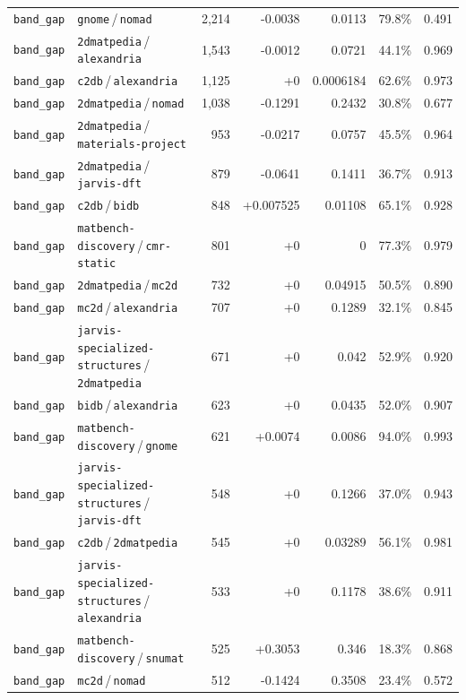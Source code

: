 \begin{longtable}{llrrrrr}
\texttt{band\_gap} & \texttt{gnome}\,/\,\texttt{nomad} & 2{,}214 & -0.0038 & 0.0113 & 79.8\% & 0.491 \\
\texttt{band\_gap} & \texttt{2dmatpedia}\,/\,\texttt{alexandria} & 1{,}543 & -0.0012 & 0.0721 & 44.1\% & 0.969 \\
\texttt{band\_gap} & \texttt{c2db}\,/\,\texttt{alexandria} & 1{,}125 & +0 & 0.0006184 & 62.6\% & 0.973 \\
\texttt{band\_gap} & \texttt{2dmatpedia}\,/\,\texttt{nomad} & 1{,}038 & -0.1291 & 0.2432 & 30.8\% & 0.677 \\
\texttt{band\_gap} & \texttt{2dmatpedia}\,/\,\texttt{materials-project} & 953 & -0.0217 & 0.0757 & 45.5\% & 0.964 \\
\texttt{band\_gap} & \texttt{2dmatpedia}\,/\,\texttt{jarvis-dft} & 879 & -0.0641 & 0.1411 & 36.7\% & 0.913 \\
\texttt{band\_gap} & \texttt{c2db}\,/\,\texttt{bidb} & 848 & +0.007525 & 0.01108 & 65.1\% & 0.928 \\
\texttt{band\_gap} & \texttt{matbench-discovery}\,/\,\texttt{cmr-static} & 801 & +0 & 0 & 77.3\% & 0.979 \\
\texttt{band\_gap} & \texttt{2dmatpedia}\,/\,\texttt{mc2d} & 732 & +0 & 0.04915 & 50.5\% & 0.890 \\
\texttt{band\_gap} & \texttt{mc2d}\,/\,\texttt{alexandria} & 707 & +0 & 0.1289 & 32.1\% & 0.845 \\
\texttt{band\_gap} & \texttt{jarvis-specialized-structures}\,/\,\texttt{2dmatpedia} & 671 & +0 & 0.042 & 52.9\% & 0.920 \\
\texttt{band\_gap} & \texttt{bidb}\,/\,\texttt{alexandria} & 623 & +0 & 0.0435 & 52.0\% & 0.907 \\
\texttt{band\_gap} & \texttt{matbench-discovery}\,/\,\texttt{gnome} & 621 & +0.0074 & 0.0086 & 94.0\% & 0.993 \\
\texttt{band\_gap} & \texttt{jarvis-specialized-structures}\,/\,\texttt{jarvis-dft} & 548 & +0 & 0.1266 & 37.0\% & 0.943 \\
\texttt{band\_gap} & \texttt{c2db}\,/\,\texttt{2dmatpedia} & 545 & +0 & 0.03289 & 56.1\% & 0.981 \\
\texttt{band\_gap} & \texttt{jarvis-specialized-structures}\,/\,\texttt{alexandria} & 533 & +0 & 0.1178 & 38.6\% & 0.911 \\
\texttt{band\_gap} & \texttt{matbench-discovery}\,/\,\texttt{snumat} & 525 & +0.3053 & 0.346 & 18.3\% & 0.868 \\
\texttt{band\_gap} & \texttt{mc2d}\,/\,\texttt{nomad} & 512 & -0.1424 & 0.3508 & 23.4\% & 0.572 \\

\end{longtable}
